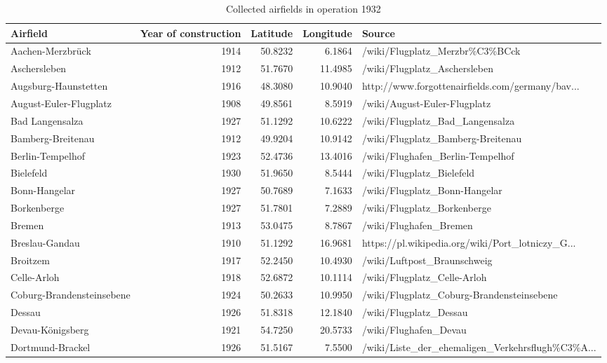 \begin{table}[h!]
\centering
\caption{Collected airfields in operation 1932\label{tab:airfields}} 
{\scriptsize
\begin{tabular}{p{2.8cm}rrrp{6cm}}
  \toprule
Airfield & Year of construction & Latitude & Longitude & Source \\ 
  \midrule
Aachen-Merzbr\"uck & 1914 & 50.8232 & 6.1864 & /wiki/Flugplatz\_Merzbr\%C3\%BCck \\ 
  Aschersleben & 1912 & 51.7670 & 11.4985 & /wiki/Flugplatz\_Aschersleben \\ 
  Augsburg-Haunstetten & 1916 & 48.3080 & 10.9040 & http://www.forgottenairfields.com/germany/bav... \\ 
  August-Euler-Flugplatz & 1908 & 49.8561 & 8.5919 & /wiki/August-Euler-Flugplatz \\ 
  Bad Langensalza & 1927 & 51.1292 & 10.6222 & /wiki/Flugplatz\_Bad\_Langensalza \\ 
  Bamberg-Breitenau & 1912 & 49.9204 & 10.9142 & /wiki/Flugplatz\_Bamberg-Breitenau \\ 
  Berlin-Tempelhof & 1923 & 52.4736 & 13.4016 & /wiki/Flughafen\_Berlin-Tempelhof \\ 
  Bielefeld & 1930 & 51.9650 & 8.5444 & /wiki/Flugplatz\_Bielefeld \\ 
  Bonn-Hangelar & 1927 & 50.7689 & 7.1633 & /wiki/Flugplatz\_Bonn-Hangelar \\ 
  Borkenberge & 1927 & 51.7801 & 7.2889 & /wiki/Flugplatz\_Borkenberge \\ 
   \midrule
Bremen  & 1913 & 53.0475 & 8.7867 & /wiki/Flughafen\_Bremen \\ 
  Breslau-Gandau & 1910 & 51.1292 & 16.9681 & https://pl.wikipedia.org/wiki/Port\_lotniczy\_G... \\ 
  Broitzem & 1917 & 52.2450 & 10.4930 & /wiki/Luftpost\_Braunschweig \\ 
  Celle-Arloh & 1918 & 52.6872 & 10.1114 & /wiki/Flugplatz\_Celle-Arloh \\ 
  Coburg-Brandensteinsebene & 1924 & 50.2633 & 10.9950 & /wiki/Flugplatz\_Coburg-Brandensteinsebene \\ 
  Dessau & 1926 & 51.8318 & 12.1840 & /wiki/Flugplatz\_Dessau \\ 
  Devau-K\"onigsberg & 1921 & 54.7250 & 20.5733 & /wiki/Flughafen\_Devau \\ 
  Dortmund-Brackel & 1926 & 51.5167 & 7.5500 & /wiki/Liste\_der\_ehemaligen\_Verkehrsflugh\%C3\%A... \\ 

\end{tabular}}
\end{table}
